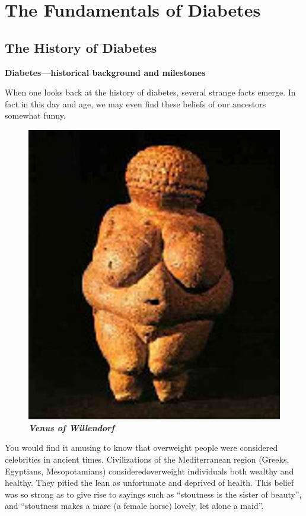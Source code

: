 
\part{The Fundamentals of Diabetes}

\chapter{The History of Diabetes}

\textbf{Diabetes—historical background and milestones}

When one looks back at the history of diabetes, several strange facts emerge. In fact in this day and age, we may even find these beliefs of our ancestors somewhat funny.

\begin{figure}
\centering
\includegraphics[scale=.8]{images/004.jpg}\\
\textbf{\textit{Venus of Willendorf}}
\end{figure}

You would find it amusing to know that overweight people were considered celebrities in ancient times. Civilizations of the Mediterranean region (Greeks, Egyptians, Mesopotamians) considered\break overweight individuals both wealthy and healthy. They pitied the lean as unfortunate and deprived of health. This belief was so strong as to give rise to sayings such as “stoutness is the sister of beauty”, and “stoutness makes a mare (a female horse) lovely, let alone a maid”.

